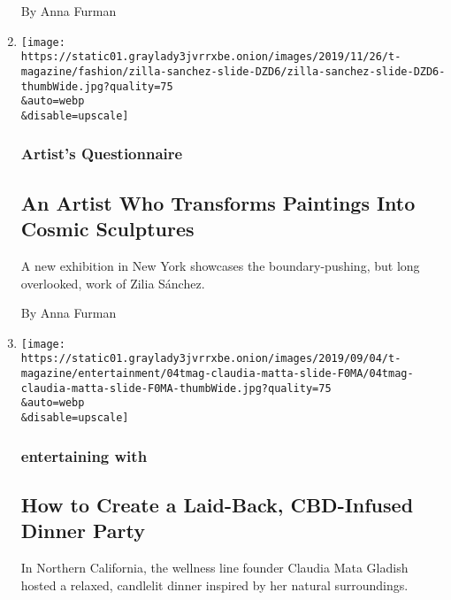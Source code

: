 \begin{enumerate}
  By Anna Furman
\item
  \href{/2019/11/29/t-magazine/zilia-sanchez.html}{}

  \texttt{[image: https://static01.graylady3jvrrxbe.onion/images/2019/11/26/t-magazine/fashion/zilla-sanchez-slide-DZD6/zilla-sanchez-slide-DZD6-thumbWide.jpg?quality=75\\\&auto=webp\\\&disable=upscale]}

  \hypertarget{artists-questionnaire}{%
  \subsubsection{Artist's Questionnaire}\label{artists-questionnaire}}

  \hypertarget{an-artist-who-transforms-paintings-into-cosmic-sculptures}{%
  \subsection{An Artist Who Transforms Paintings Into Cosmic
  Sculptures}\label{an-artist-who-transforms-paintings-into-cosmic-sculptures}}

  A new exhibition in New York showcases the boundary-pushing, but long
  overlooked, work of Zilia Sánchez.

  By Anna Furman
\item
  \href{/2019/09/10/t-magazine/vertly-claudia-mata-gladish.html}{}

  \texttt{[image: https://static01.graylady3jvrrxbe.onion/images/2019/09/04/t-magazine/entertainment/04tmag-claudia-matta-slide-F0MA/04tmag-claudia-matta-slide-F0MA-thumbWide.jpg?quality=75\\\&auto=webp\\\&disable=upscale]}

  \hypertarget{entertaining-with-2}{%
  \subsubsection{entertaining with}\label{entertaining-with-2}}

  \hypertarget{how-to-create-a-laid-back-cbd-infused-dinner-party}{%
  \subsection{How to Create a Laid-Back, CBD-Infused Dinner
  Party}\label{how-to-create-a-laid-back-cbd-infused-dinner-party}}

  In Northern California, the wellness line founder Claudia Mata Gladish
  hosted a relaxed, candlelit dinner inspired by her natural
  surroundings.


\end{enumerate}
